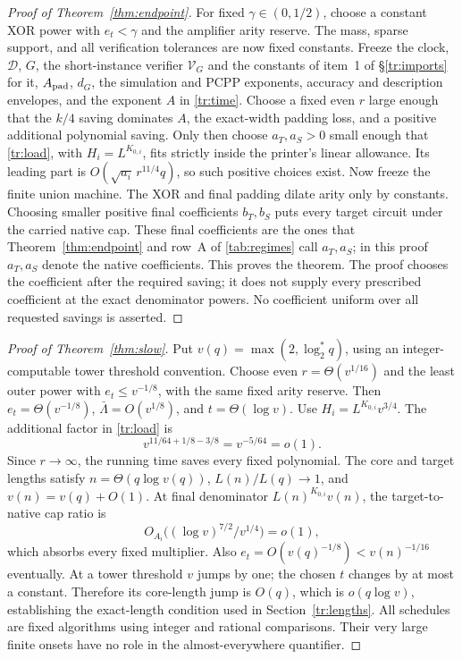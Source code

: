 \documentclass[11pt,letterpaper]{article}
\theoremstyle{definition}
\theoremstyle{remark}
\begin{document}
\begin{proof}[Proof of Theorem~\ref{thm:endpoint}]
For fixed $\gamma\in(0,1/2)$, choose a constant XOR power with
$e_t<\gamma$ and the amplifier arity reserve. The mass, sparse
support, and all verification tolerances are now fixed constants.
Freeze the clock, $\mathcal D$, $G$, the short-instance verifier $\mathcal V_G$ and
the constants of item~1 of \S\ref{tr:imports} for it, $A_{\rm pad}$,
$d_G$, the simulation and PCPP exponents,
accuracy and description envelopes, and the exponent $A$ in
\eqref{tr:time}. Choose a fixed even $r$ large enough that the
$k/4$ saving dominates $A$, the exact-width padding loss, and a
positive additional polynomial saving. Only then choose $a_T,a_S>0$
small enough that \eqref{tr:load}, with $H_i=L^{K_{0,i}}$, fits
strictly inside the printer's linear allowance. Its leading part is
$O(\sqrt{a_i}\,r^{11/4}q)$, so such positive choices exist.
Now freeze the finite union machine.
The XOR and final padding dilate arity only by constants. Choosing
smaller positive final coefficients $b_T,b_S$ puts every target
circuit under the carried native cap. These final coefficients are the
ones that Theorem~\ref{thm:endpoint} and row~A of \cref{tab:regimes}
call $a_T,a_S$; in this proof $a_T,a_S$ denote the native coefficients.
This proves the theorem.
The proof chooses the coefficient after the required saving; it does
not supply every prescribed coefficient at the exact denominator
powers. No coefficient uniform over all requested savings is asserted.
\end{proof}

\begin{proof}[Proof of Theorem~\ref{thm:slow}]
Put $v(q)=\max(2,\log_2^*q)$, using an integer-computable tower
threshold convention. Choose even $r=\Theta(v^{1/16})$ and the least
outer power with $e_t\le v^{-1/8}$, with the same fixed arity reserve.
Then $e_t=\Theta(v^{-1/8})$,
$\bar\Lambda=O(v^{1/8})$, and $t=\Theta(\log v)$.
Use $H_i=L^{K_{0,i}}v^{3/4}$. The additional factor in
\eqref{tr:load} is
\[
 v^{11/64+1/8-3/8}=v^{-5/64}=o(1).
\]
Since $r\to\infty$, the running time saves every fixed polynomial.
The core and target lengths satisfy $n=\Theta(q\log v(q))$,
$L(n)/L(q)\to1$, and $v(n)=v(q)+O(1)$.
At final denominator $L(n)^{K_{0,i}}v(n)$, the target-to-native
cap ratio is
\[
 O_{A_i}\bigl((\log v)^{7/2}/v^{1/4}\bigr)=o(1),
\]
which absorbs every fixed multiplier. Also
$e_t=O(v(q)^{-1/8})<v(n)^{-1/16}$ eventually.
At a tower threshold $v$ jumps by one; the chosen $t$ changes by
at most a constant. Therefore its core-length jump is $O(q)$,
which is $o(q\log v)$, establishing the exact-length condition
used in Section~\ref{tr:lengths}.
All schedules are fixed algorithms using integer and rational
comparisons. Their very large finite onsets have no role in the
almost-everywhere quantifier.
\end{proof}
\end{document}
